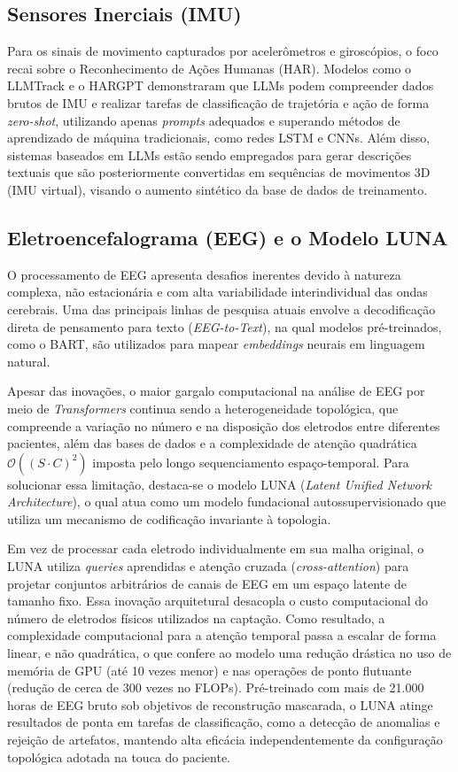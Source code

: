 \subsection{Sensores Inerciais (IMU)}
Para os sinais de movimento capturados por acelerômetros e giroscópios, o foco recai sobre o
Reconhecimento de Ações Humanas (HAR). Modelos como o LLMTrack e o HARGPT
demonstraram que LLMs podem compreender dados brutos de IMU e realizar tarefas de
classificação de trajetória e ação de forma \textit{zero-shot}, utilizando apenas
\textit{prompts} adequados e superando métodos de aprendizado de máquina tradicionais,
como redes LSTM e CNNs. Além disso, sistemas baseados em LLMs estão sendo empregados
para gerar descrições textuais que são posteriormente convertidas em sequências de movimentos
3D (IMU virtual), visando o aumento sintético da base de dados de treinamento.

\subsection{Eletroencefalograma (EEG) e o Modelo LUNA}
O processamento de EEG apresenta desafios inerentes devido à natureza complexa, não
estacionária e com alta variabilidade interindividual das ondas cerebrais. Uma das
principais linhas de pesquisa atuais envolve a decodificação direta de pensamento para texto
(\textit{EEG-to-Text}), na qual modelos pré-treinados, como o BART, são utilizados para mapear
\textit{embeddings} neurais em linguagem natural. 

Apesar das inovações, o maior gargalo computacional na análise de EEG por meio de
\textit{Transformers} continua sendo a heterogeneidade topológica, que compreende a variação no número e
na disposição dos eletrodos entre diferentes pacientes, além das bases de dados e a complexidade
de atenção quadrática $\mathcal{O}((S\cdot C)^2)$ imposta pelo longo sequenciamento
espaço-temporal. Para solucionar essa limitação, destaca-se o modelo
LUNA (\textit{Latent Unified Network Architecture}), o qual atua como um modelo
fundacional autossupervisionado que utiliza um mecanismo de codificação invariante à
topologia.

Em vez de processar cada eletrodo individualmente em sua malha original, o LUNA
utiliza \textit{queries} aprendidas e atenção cruzada (\textit{cross-attention}) para
projetar conjuntos arbitrários de canais de EEG em um espaço latente de tamanho fixo.
Essa inovação arquitetural desacopla o custo computacional do número de eletrodos físicos
utilizados na captação. Como resultado, a complexidade computacional para a
atenção temporal passa a escalar de forma linear, e não quadrática, o que confere ao
modelo uma redução drástica no uso de memória de GPU (até 10 vezes menor) e nas operações
de ponto flutuante (redução de cerca de 300 vezes no FLOPs). Pré-treinado com mais
de 21.000 horas de EEG bruto sob objetivos de reconstrução mascarada, o LUNA atinge resultados
de ponta em tarefas de classificação, como a detecção de anomalias e rejeição de artefatos,
mantendo alta eficácia independentemente da configuração topológica adotada na touca do
paciente.

